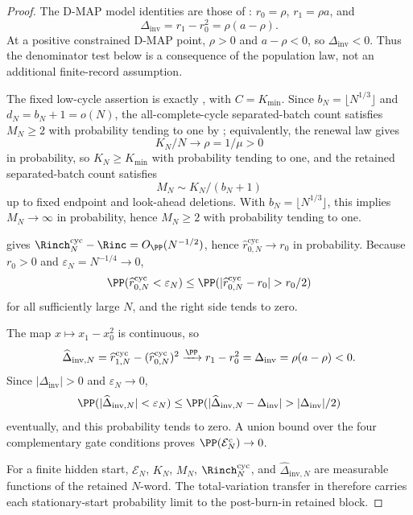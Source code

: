 \begin{proof}
The D-MAP model identities are those of
:
\(r_0=\rho\), \(r_1=\rho a\), and
\[
\Delta_{\mathrm{inv}}=r_1-r_0^2=\rho(a-\rho).
\]
At a positive constrained D-MAP point, \(\rho>0\) and
\(a-\rho<0\), so \(\Delta_{\mathrm{inv}}<0\).  Thus the denominator test below is a consequence
of the population law, not an additional finite-record assumption.

The fixed low-cycle assertion is exactly
, with \(C=K_{\min}\).  Since
\(b_N=\lfloor N^{1/3}\rfloor\) and \(d_N=b_N+1=o(N)\), the all-complete-cycle
separated-batch count satisfies \(M_N\ge2\) with probability tending to one by
; equivalently, the
renewal law gives
\[
K_N/N\to\rho=1/\mu>0
\]
in probability, so \(K_N\ge K_{\min}\) with probability tending to one, and
the retained separated-batch count satisfies
\[
M_N\sim K_N/(b_N+1)
\]
up to fixed endpoint and look-ahead deletions.  With
\(b_N=\lfloor N^{1/3}\rfloor\), this implies \(M_N\to\infty\) in probability,
hence \(M_N\ge2\) with probability tending to one.

 gives
\(\Rinch_N^{\mathrm{cyc}}-\Rinc=O_{\PP}(N^{-1/2})\), hence
\(\widehat r_{0,N}^{\mathrm{cyc}}\to r_0\) in probability.  Because
\(r_0>0\) and \(\varepsilon_N=N^{-1/4}\to0\),
\[
\PP(\widehat r_{0,N}^{\mathrm{cyc}}<\varepsilon_N)
\le
\PP(|\widehat r_{0,N}^{\mathrm{cyc}}-r_0|>r_0/2)
\]
for all sufficiently large \(N\), and the right side tends to zero.

The map \(x\mapsto x_1-x_0^2\) is continuous, so
\[
\widehat\Delta_{\mathrm{inv},N}
=\widehat r_{1,N}^{\mathrm{cyc}}
 -(\widehat r_{0,N}^{\mathrm{cyc}})^2
\xrightarrow{\PP}
r_1-r_0^2=\Delta_{\mathrm{inv}}=\rho(a-\rho)<0 .
\]
Since \(|\Delta_{\mathrm{inv}}|>0\) and \(\varepsilon_N\to0\),
\[
\PP(|\widehat\Delta_{\mathrm{inv},N}|<\varepsilon_N)
\le
\PP(|\widehat\Delta_{\mathrm{inv},N}-\Delta_{\mathrm{inv}}|>|\Delta_{\mathrm{inv}}|/2)
\]
eventually, and this probability tends to zero.  A union bound over the four
complementary gate conditions proves \(\PP(\mathcal E_N^c)\to0\).

For a finite hidden start, \(\mathcal E_N\), \(K_N\), \(M_N\),
\(\Rinch_N^{\mathrm{cyc}}\), and \(\widehat\Delta_{\mathrm{inv},N}\) are measurable functions
of the retained \(N\)-word.  The total-variation transfer in
 therefore carries each
stationary-start probability limit to the post-burn-in retained block.
\end{proof}

